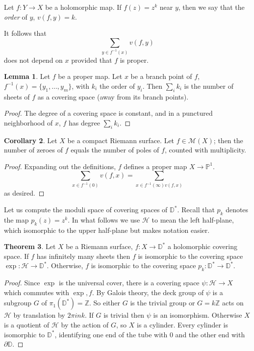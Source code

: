 \documentclass[12pt]{book}
\newcommand{\ZZ}{\mathbb{Z}}
\newcommand{\PP}{\mathbb{P}}
\newcommand{\DD}{\mathbb{D}}
\newcommand{\Mero}{\mathscr M}
\newcommand{\HH}{\mathcal H}
\newcommand{\dfn}[1]{\emph{#1}\index{#1}}
\theoremstyle{definition}
\newtheorem{theorem}{Theorem}[chapter]
\newtheorem{lemma}[theorem]{Lemma}
\newtheorem{corollary}[theorem]{Corollary}
\newenvironment{definition}
  {\pushQED{\qed}\renewcommand{\qedsymbol}{$\diamondsuit$}\definitionx}
  {\popQED\endexamplex}
\begin{document}
\begin{definition}
Let $f: Y \to X$ be a holomorphic map.
If $f(z) = z^k$ near $y$, then we say that the \dfn{order} of $y$, $v(f, y) = k$.
\end{definition}

It follows that
$$\sum_{y \in f^{-1}(x)} v(f, y)$$
does not depend on $x$ provided that $f$ is proper.

\begin{lemma}
Let $f$ be a proper map.
Let $x$ be a branch point of $f$, $f^{-1}(x) = \{y_1, \dots, y_m\}$, with $k_i$ the order of $y_i$.
Then $\sum_i k_i$ is the number of sheets of $f$ as a covering space (away from its branch points).
\end{lemma}
\begin{proof}
The degree of a covering space is constant, and in a punctured neighborhood of $x$, $f$ has degree $\sum_i k_i$.
\end{proof}

\begin{corollary}
Let $X$ be a compact Riemann surface.
Let $f \in \Mero(X)$; then the number of zeroes of $f$ equals the number of poles of $f$, counted with multiplicity.
\end{corollary}
\begin{proof}
Expanding out the definitions, $f$ defines a proper map $X \to \PP^1$.
$$\sum_{x \in f^{-1}(0)} v(f, x) = \sum_{x \in f^{-1}(\infty) v(f, x)}$$
as desired.
\end{proof}

Let us compute the moduli space of covering spaces of $\DD^*$.
Recall that $p_k$ denotes the map $p_k(z) = z^k$.
In what follows we use $\HH$ to mean the left half-plane, which isomorphic to the upper half-plane but makes notation easier.

\begin{theorem}
Let $X$ be a Riemann surface, $f: X \to \DD^*$ a holomorphic covering space.
If $f$ has infinitely many sheets then $f$ is isomorphic to the covering space $\exp: \HH \to \DD^*$.
Otherwise, $f$ is isomorphic to the covering space $p_k: \DD^* \to \DD^*$.
\end{theorem}
\begin{proof}
Since $\exp$ is the universal cover, there is a covering space $\psi: \HH \to X$ which commutes with $\exp, f$.
By Galois theory, the deck group of $\psi$ is a subgroup $G$ of $\pi_1(\DD^*) = \ZZ$.
So either $G$ is the trivial group or $G = k\ZZ$ acts on $\HH$ by translation by $2\pi ink$.
If $G$ is trivial then $\psi$ is an isomorphism.
Otherwise $X$ is a quotient of $\HH$ by the action of $G$, so $X$ is a cylinder.
Every cylinder is isomorphic to $\DD^*$, identifying one end of the tube with $0$ and the other end with $\partial \DD$.
\end{proof}
\end{document}
